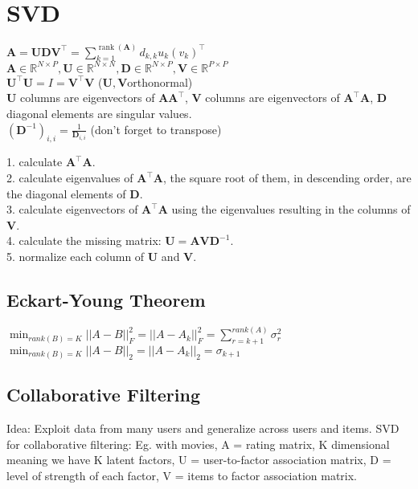 \section{SVD}
$\mathbf{A} = \mathbf{U} \mathbf{D} \mathbf{V}^\top = \sum_{k=1}^{\operatorname{rank}(\mathbf{A})} d_{k,k} u_k (v_k)^\top$\\
$\mathbf{A} \in \mathbb{R}^{N \times P}, \mathbf{U} \in \mathbb{R}^{N \times N}, \mathbf{D} \in \mathbb{R}^{N \times P}, \mathbf{V} \in \mathbb{R}^{P \times P}$\\
$\mathbf{U}^\top \mathbf{U} = I = \mathbf{V}^\top \mathbf{V}$ ($\mathbf{U}, \mathbf{V}$orthonormal)\\
$\mathbf{U}$ columns are eigenvectors of $\mathbf{A} \mathbf{A}^\top$, $\mathbf{V}$ columns are eigenvectors of $\mathbf{A}^\top \mathbf{A}$, $\mathbf{D}$ diagonal elements are singular values.\\
$(\mathbf{D}^{-1})_{i,i} = \frac{1}{\mathbf{D}_{i, i}}$ (don't forget to transpose)

1. calculate $\mathbf{A}^\top \mathbf{A}$.\\
2. calculate eigenvalues of $\mathbf{A}^\top \mathbf{A}$, the square root of them, in descending order, are the diagonal elements of $\mathbf{D}$.\\
3. calculate eigenvectors of $\mathbf{A}^\top \mathbf{A}$ using the eigenvalues resulting in the columns of $\mathbf{V}$.\\
4. calculate the missing matrix: $\mathbf{U} = \mathbf{A} \mathbf{V} \mathbf{D}^{-1}$.\\
5. normalize each column of $\mathbf{U}$ and $\mathbf{V}$.

\subsection*{Eckart-Young Theorem}
$\min_{rank(B)=K} ||A-B||_F^2 = ||A-A_k||_F^2 = \sum_{r=k+1}^{rank(A)} \sigma_r^2$
$\min_{rank(B)=K} ||A-B||_2 = ||A-A_k||_2 = \sigma_{k+1}$

\subsection*{Collaborative Filtering}
Idea: Exploit data from many users and generalize across users and items. 
SVD for collaborative filtering: Eg. with movies, A = rating matrix, K dimensional meaning we have K latent factors, U = user-to-factor association matrix, D = level of strength of each factor, V = items to factor association matrix.